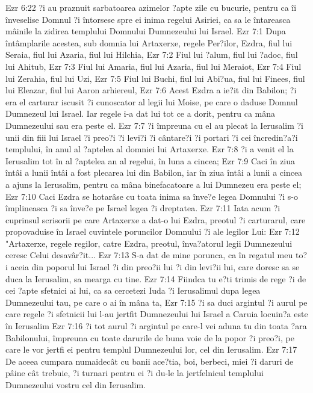 Ezr 6:22  ?i au praznuit sarbatoarea azimelor ?apte zile cu bucurie, pentru ca îi înveselise Domnul ?i întorsese spre ei inima regelui Asiriei, ca sa le întareasca mâinile la zidirea templului Domnului Dumnezeului lui Israel.
Ezr 7:1  Dupa întâmplarile acestea, sub domnia lui Artaxerxe, regele Per?ilor, Ezdra, fiul lui Seraia, fiul lui Azaria, fiul lui Hilchia,
Ezr 7:2  Fiul lui ?alum, fiul lui ?adoc, fiul lui Ahitub,
Ezr 7:3  Fiul lui Amaria, fiul lui Azaria, fiul lui Meraiot,
Ezr 7:4  Fiul lui Zerahia, fiul lui Uzi,
Ezr 7:5  Fiul lui Buchi, fiul lui Abi?ua, fiul lui Finees, fiul lui Eleazar, fiul lui Aaron arhiereul,
Ezr 7:6  Acest Ezdra a ie?it din Babilon; ?i era el carturar iscusit ?i cunoscator al legii lui Moise, pe care o daduse Domnul Dumnezeul lui Israel. Iar regele i-a dat lui tot ce a dorit, pentru ca mâna Dumnezeului sau era peste el.
Ezr 7:7  ?i împreuna cu el au plecat la Ierusalim ?i unii din fiii lui Israel ?i preo?i ?i levi?i ?i cântare?i ?i portari ?i cei încredin?a?i templului, în anul al ?aptelea al domniei lui Artaxerxe.
Ezr 7:8  ?i a venit el la Ierusalim tot în al ?aptelea an al regelui, în luna a cincea;
Ezr 7:9  Caci în ziua întâi a lunii întâi a fost plecarea lui din Babilon, iar în ziua întâi a lunii a cincea a ajuns la Ierusalim, pentru ca mâna binefacatoare a lui Dumnezeu era peste el;
Ezr 7:10  Caci Ezdra se hotarâse cu toata inima sa înve?e legea Domnului ?i s-o împlineasca ?i sa înve?e pe Israel legea ?i dreptatea.
Ezr 7:11  Iata acum ?i cuprinsul scrisorii pe care Artaxerxe a dat-o lui Ezdra, preotul ?i carturarul, care propovaduise în Israel cuvintele poruncilor Domnului ?i ale legilor Lui:
Ezr 7:12  "Artaxerxe, regele regilor, catre Ezdra, preotul, înva?atorul legii Dumnezeului ceresc Celui desavâr?it...
Ezr 7:13  S-a dat de mine porunca, ca în regatul meu to?i aceia din poporul lui Israel ?i din preo?ii lui ?i din levi?ii lui, care doresc sa se duca la Ierusalim, sa mearga cu tine.
Ezr 7:14  Fiindca tu e?ti trimis de rege ?i de cei ?apte sfetnici ai lui, ca sa cercetezi Iuda ?i Ierusalimul dupa legea Dumnezeului tau, pe care o ai în mâna ta,
Ezr 7:15  ?i sa duci argintul ?i aurul pe care regele ?i sfetnicii lui l-au jertfit Dumnezeului lui Israel a Caruia locuin?a este în Ierusalim
Ezr 7:16  ?i tot aurul ?i argintul pe care-l vei aduna tu din toata ?ara Babilonului, împreuna cu toate darurile de buna voie de la popor ?i preo?i, pe care le vor jertfi ei pentru templul Dumnezeului lor, cel din Ierusalim.
Ezr 7:17  De aceea cumpara numaidecât cu banii ace?tia, boi, berbeci, miei ?i daruri de pâine cât trebuie, ?i turnari pentru ei ?i du-le la jertfelnicul templului Dumnezeului vostru cel din Ierusalim.
